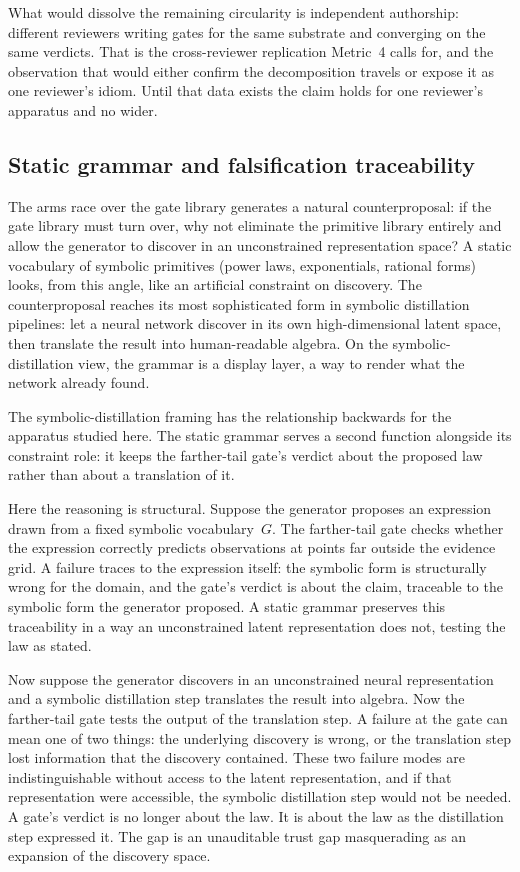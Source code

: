 \documentclass[
  11pt,
]{article}
\begin{document}
What would dissolve the remaining circularity is independent authorship:
different reviewers writing gates for the same substrate and converging on
the same verdicts. That is the cross-reviewer replication Metric~4 calls
for, and the observation that would either confirm the decomposition
travels or expose it as one reviewer's idiom. Until that data exists the
claim holds for one reviewer's apparatus and no wider.

\subsection{Static grammar and falsification
traceability}\label{static-grammar-and-falsification-traceability}

The arms race over the gate library generates a natural counterproposal:
if the gate library must turn over, why not eliminate the primitive
library entirely and allow the generator to discover in an unconstrained
representation space? A static vocabulary of symbolic primitives (power
laws, exponentials, rational forms) looks, from this angle, like an
artificial constraint on discovery. The counterproposal reaches its most
sophisticated form in symbolic distillation pipelines: let a neural
network discover in its own high-dimensional latent space, then translate
the result into human-readable algebra. On the symbolic-distillation view,
the grammar is a display layer, a way to render what the network already
found.

The symbolic-distillation framing has the relationship backwards for the
apparatus studied here. The static grammar serves a second function
alongside its constraint role: it keeps the farther-tail gate's
verdict about the proposed law rather than about a translation of it.

Here the reasoning is structural. Suppose the generator proposes an
expression
drawn from a fixed symbolic vocabulary~\(G\). The farther-tail gate
checks whether the expression correctly predicts observations at
points far outside the evidence grid. A failure
traces to the expression itself: the symbolic form is structurally
wrong for the domain, and the gate's verdict is about the claim, traceable to the symbolic
form the generator proposed. A static grammar preserves this
traceability in a way an unconstrained latent representation does not,
testing the law as stated.

Now suppose the generator discovers in an unconstrained neural
representation and a symbolic distillation step translates the result into
algebra. Now the farther-tail gate tests the output of the translation
step. A failure at the gate can mean one of two things: the underlying
discovery is wrong, or the translation step lost information that the
discovery contained. These two failure modes are indistinguishable without
access to the latent representation, and if that representation were
accessible, the symbolic distillation step would not be needed. A gate's
verdict is no longer about the law. It is about the law as the
distillation step expressed it. The gap is an unauditable trust gap
masquerading as an expansion of the discovery space.
\end{document}
